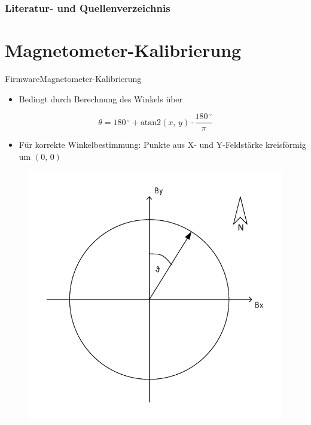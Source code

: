 \documentclass{beamer}
\begin{document}

\begin{frame}[allowframebreaks]
  \frametitle{Literatur- und Quellenverzeichnis}
   
\end{frame}

\appendix
\section{Magnetometer-Kalibrierung}
\begin{frame}{Firmware}{Magnetometer-Kalibrierung}
    \begin{itemize}
        \item Bedingt durch Berechnung des Winkels über
    \end{itemize}
    \begin{equation*}
        \theta = 180\,^\circ + \mathrm{atan2}(x,\,y) \cdot \frac{180\,^\circ}{\pi}
    \end{equation*}
    \begin{itemize}
        \item Für korrekte Winkelbestimmung: Punkte aus X- und Y-Feldstärke kreisförmig um $(0,\,0)$
    \end{itemize}
    \begin{figure}[H]
        \centering
        \includegraphics[width=.5\textwidth]{./img/Kursber.pdf}
    \end{figure}
\end{frame}
\end{document}
